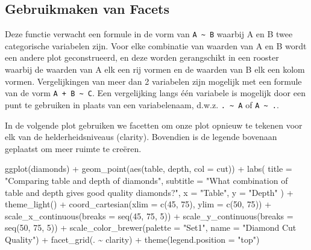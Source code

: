 \documentclass[]{tufte-book}
\newenvironment{Shaded}{}{}
\newcommand{\AttributeTok}[1]{\textcolor[rgb]{0.49,0.56,0.16}{#1}}
\newcommand{\DecValTok}[1]{\textcolor[rgb]{0.25,0.63,0.44}{#1}}
\newcommand{\FunctionTok}[1]{\textcolor[rgb]{0.02,0.16,0.49}{#1}}
\newcommand{\NormalTok}[1]{#1}
\newcommand{\SpecialCharTok}[1]{\textcolor[rgb]{0.25,0.44,0.63}{#1}}
\newcommand{\StringTok}[1]{\textcolor[rgb]{0.25,0.44,0.63}{#1}}
\begin{document}
\hypertarget{gebruikmaken-van-facets}{%
\subsection{Gebruikmaken van Facets}\label{gebruikmaken-van-facets}}

Deze functie verwacht een formule in de vorm van \texttt{A\ \textasciitilde{}\ B} waarbij A en B twee categorische variabelen zijn. Voor elke combinatie van waarden van A en B wordt een andere plot geconstrueerd, en deze worden gerangschikt in een rooster waarbij de waarden van A elk een rij vormen en de waarden van B elk een kolom vormen. Vergelijkingen van meer dan 2 variabelen zijn mogelijk met een formule van de vorm \texttt{A\ +\ B\ \textasciitilde{}\ C}. Een vergelijking langs één variabele is mogelijk door een punt te gebruiken in plaats van een variabelenaam, d.w.z. \texttt{.\ \textasciitilde{}\ A} of \texttt{A\ \textasciitilde{}\ .}.

In de volgende plot gebruiken we facetten om onze plot opnieuw te tekenen voor elk van de helderheidsniveaus (clarity). Bovendien is de legende bovenaan geplaatst om meer ruimte te creëren.

\begin{Shaded}
\begin{Highlighting}[]
\FunctionTok{ggplot}\NormalTok{(diamonds) }\SpecialCharTok{+}
  \FunctionTok{geom\_point}\NormalTok{(}\FunctionTok{aes}\NormalTok{(table, depth, }\AttributeTok{col =}\NormalTok{ cut)) }\SpecialCharTok{+}
  \FunctionTok{labs}\NormalTok{(}
    \AttributeTok{title =} \StringTok{"Comparing table and depth of diamonds"}\NormalTok{,}
    \AttributeTok{subtitle =} \StringTok{"What combination of table and depth gives good quality diamonds?"}\NormalTok{,}
    \AttributeTok{x =} \StringTok{"Table"}\NormalTok{,}
    \AttributeTok{y =} \StringTok{"Depth"}
\NormalTok{  ) }\SpecialCharTok{+}
  \FunctionTok{theme\_light}\NormalTok{() }\SpecialCharTok{+}
  \FunctionTok{coord\_cartesian}\NormalTok{(}\AttributeTok{xlim =} \FunctionTok{c}\NormalTok{(}\DecValTok{45}\NormalTok{, }\DecValTok{75}\NormalTok{), }\AttributeTok{ylim =} \FunctionTok{c}\NormalTok{(}\DecValTok{50}\NormalTok{, }\DecValTok{75}\NormalTok{)) }\SpecialCharTok{+}
  \FunctionTok{scale\_x\_continuous}\NormalTok{(}\AttributeTok{breaks =} \FunctionTok{seq}\NormalTok{(}\DecValTok{45}\NormalTok{, }\DecValTok{75}\NormalTok{, }\DecValTok{5}\NormalTok{)) }\SpecialCharTok{+}
  \FunctionTok{scale\_y\_continuous}\NormalTok{(}\AttributeTok{breaks =} \FunctionTok{seq}\NormalTok{(}\DecValTok{50}\NormalTok{, }\DecValTok{75}\NormalTok{, }\DecValTok{5}\NormalTok{)) }\SpecialCharTok{+}
  \FunctionTok{scale\_color\_brewer}\NormalTok{(}\AttributeTok{palette =} \StringTok{"Set1"}\NormalTok{, }\AttributeTok{name =} \StringTok{"Diamond Cut Quality"}\NormalTok{) }\SpecialCharTok{+}
  \FunctionTok{facet\_grid}\NormalTok{(. }\SpecialCharTok{\textasciitilde{}}\NormalTok{ clarity) }\SpecialCharTok{+}
  \FunctionTok{theme}\NormalTok{(}\AttributeTok{legend.position =} \StringTok{"top"}\NormalTok{)}
\end{Highlighting}
\end{Shaded}
\end{document}
